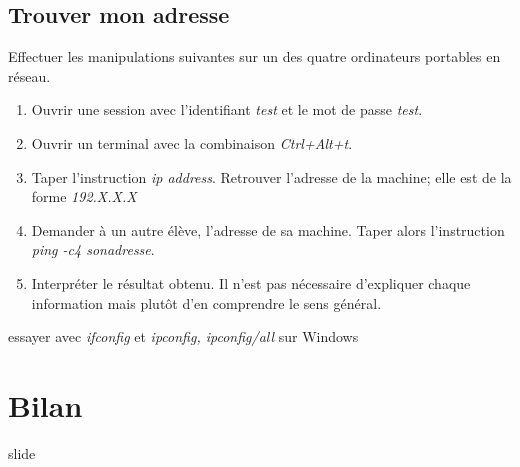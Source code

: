 \documentclass[a4paper,11pt]{article}
\begin{document}
\begin{Form}
\subsection{Trouver mon adresse}
Effectuer les manipulations suivantes sur un des quatre ordinateurs portables en réseau.
\begin{enumerate}
\item Ouvrir une session avec l'identifiant \emph{test} et le mot de passe \emph{test}.
\item Ouvrir un terminal avec la combinaison \emph{Ctrl+Alt+t}.
\item Taper l'instruction \emph{ip address}. Retrouver l'adresse de la machine; elle est de la forme \emph{192.X.X.X}
\item Demander à un autre élève, l'adresse de sa machine. Taper alors l'instruction \emph{ping -c4 sonadresse}.
\item Interpréter le résultat obtenu. Il n'est pas nécessaire d'expliquer chaque information mais plutôt d'en comprendre le sens général.
\end{enumerate}
\begin{commentprof}
essayer avec \emph{ifconfig} et \emph{ipconfig, ipconfig/all} sur Windows
\end{commentprof}
\section*{Bilan}
\begin{commentprof}
slide
\end{commentprof}
\end{Form}
\end{document}
